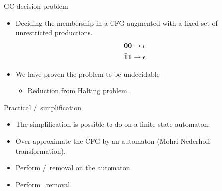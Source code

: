 \documentclass[xcolor=x11names,compress,mathserif]{beamer}
\renewcommand{\(}{\begin{columns}}
\renewcommand{\)}{\end{columns}}
\newcommand{\<}[1]{\begin{column}{#1}}
\renewcommand{\>}{\end{column}}
\begin{document}
\begin{frame}{GC decision problem}
\begin{itemize}
\item Deciding the
  membership in  a CFG augmented  with a
  fixed set of unrestricted productions.
  \begin{align*}
    \bar{\mathbf{0}}\mathbf{0}    \rightarrow    \epsilon\\
    \bar{\mathbf{1}}\mathbf{1}    \rightarrow   \epsilon\\
  \end{align*}
\item We have proven the problem to be undecidable
  \begin{itemize}
  \item Reduction from Halting problem.
  \end{itemize}
\end{itemize}
\end{frame}
\begin{frame}{Practical \bcar/\bcdr\  simplification}

\begin{itemize}
\item The simplification is possible to do on a finite state automaton.
\item Over-approximate the CFG by an automaton
  (Mohri-Nederhoff transformation).
\item Perform \acar/\acdr\ removal on the automaton.
\item Perform \clazy\ removal.
\end{itemize}

\end{frame}
\end{document}
